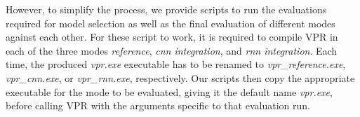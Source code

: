 However, to simplify the process, we provide scripts to run the evaluations required for model selection as well as the final evaluation of different modes against each other. For these script to work, it is required to compile \gls{VPR} in each of the three modes \textit{reference}, \textit{cnn integration}, and \textit{rnn integration}. Each time, the produced \textit{vpr.exe} executable has to be renamed to \textit{vpr\_reference.exe}, \textit{vpr\_cnn.exe}, or \textit{vpr\_rnn.exe}, respectively. Our scripts then copy the appropriate executable for the mode to be evaluated, giving it the default name \textit{vpr.exe}, before calling \gls{VPR} with the arguments specific to that evaluation run.


